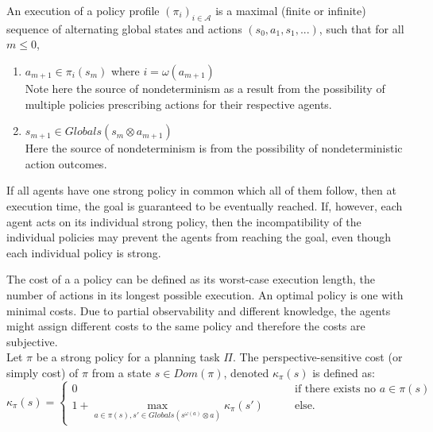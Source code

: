An execution of a policy profile $(\pi_i)_{i \in \mathcal{A}}$ is a maximal (finite or infinite) sequence of alternating global states and actions $(s_0, a_1, s_1,...)$, such that for all $m \leq 0$,
\begin{enumerate}
  \item $a_{m+1} \in \pi_i(s_m)$ where $i=\omega(a_{m+1})$ \\
    Note here the source of nondeterminism as a result from the possibility of multiple policies prescribing actions for their respective agents.
  \item $s_{m+1} \in Globals(s_m \otimes a_{m+1}) $ \\
    Here the source of nondeterminism is from the possibility of nondeterministic action outcomes.
\end{enumerate}


If all agents have one strong policy in common which all of them follow, then at execution time, the goal is guaranteed to be eventually reached. If, however, each agent acts on its individual strong policy, then the incompatibility of the individual policies may prevent the agents from reaching the goal, even though each individual policy is strong.



The cost of a a policy can be defined as its worst-case execution length, the number of actions in its longest possible execution. An optimal policy is one with minimal costs. Due to partial observability and different knowledge, the agents might assign different costs to the same policy and therefore the costs are subjective. \\
Let $\pi$ be a strong policy for a planning task $\Pi$. The perspective-sensitive cost (or simply cost) of $\pi$ from a state $s\in Dom(\pi)$, denoted $\kappa_{\pi}(s)$ is defined as:
$$\kappa_{\pi}(s) =
\begin{cases}
0 \qquad & \text{if there exists no } a \in \pi(s)\\
1+ \max_{a\in \pi(s), s'\in Globals(s^{\omega(a)} \otimes a)} \kappa_{\pi}(s') \qquad & \text{else.}
\end{cases}$$
